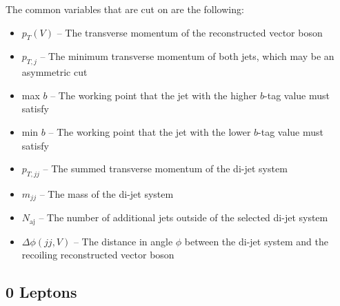 The common variables that are cut on are the following:
\begin{itemize}
\item $p_T(V)$ -- The transverse momentum of the reconstructed vector boson
\item $p_{T,j}$ -- The minimum transverse momentum of both jets,
  which may be an asymmetric cut
\item max $b$ -- The working point that the jet with the higher $b$-tag value must satisfy
\item min $b$ -- The working point that the jet with the lower $b$-tag value must satisfy
\item $p_{T,jj}$ -- The summed transverse momentum of the di-jet system
\item $m_{jj}$ -- The mass of the di-jet system
\item $N_\textrm{aj}$ -- The number of additional jets outside of the selected di-jet system
\item $\Delta\phi(jj, V)$ -- The distance in angle $\phi$ between the di-jet system
  and the recoiling reconstructed vector boson
\end{itemize}

\subsection{0 Leptons} \label{sec:resolved-0}

